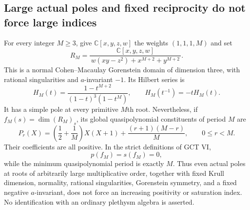 \subsection{Large actual poles and fixed reciprocity do not force large indices}

\begin{proposition}
\label{prop:largeperiodzeroindices}
For every integer $M\ge3$, give
$\mathbb C[x,y,z,w]$ the weights $(1,1,1,M)$ and set
\[
 R_M=\frac{\mathbb C[x,y,z,w]}
 {\,w(xy-z^2)+x^{M+2}+y^{M+2}\,}.
 \tag{P-F33a}
\]
This is a normal Cohen--Macaulay Gorenstein domain of
dimension three, with rational singularities and
$a$-invariant $-1$. Its Hilbert series is
\[
 H_M(t)=\frac{1-t^{M+2}}{(1-t)^3(1-t^M)},
 \qquad H_M(t^{-1})=-tH_M(t).
 \tag{P-F33b}
\]
It has a simple pole at every primitive $M$th root.
Nevertheless, if $f_M(s)=\dim(R_M)_s$, its global
quasipolynomial constituents of period $M$ are
\[
 P_r(X)=\left(\frac12+\frac1M\right)X(X+1)
                +\frac{(r+1)(M-r)}M,
 \qquad 0\le r<M.
 \tag{P-F33c}
\]
Their coefficients are all positive. In the strict
definitions of GCT VI,
\[
 p(f_M)=s(f_M)=0,
 \tag{P-F33d}
\]
while the minimum quasipolynomial period is exactly $M$.
Thus even actual poles at roots of arbitrarily large
multiplicative order, together with fixed
Krull dimension, normality, rational singularities,
Gorenstein symmetry, and a fixed negative $a$-invariant,
does not force an increasing positivity or saturation index.
No identification with an ordinary plethysm algebra is asserted.
\end{proposition}

